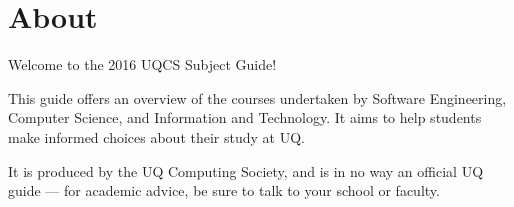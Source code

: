 \section{About}
Welcome to the 2016 UQCS Subject Guide!

This guide offers an overview of the courses undertaken by Software Engineering, Computer Science, and Information and Technology.
It aims to help students make informed choices about their study at UQ.

It is produced by the UQ Computing Society, and is in no way an official UQ guide --- for academic advice, be sure to talk to your school or faculty.


